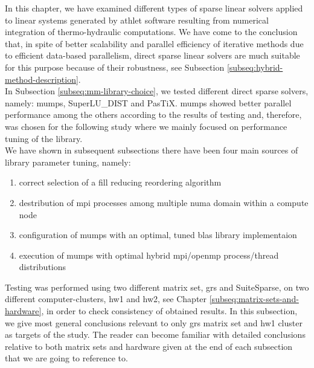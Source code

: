 \label{subseq:mm-conclusion}

In this chapter, we have examined different types of sparse linear solvers applied to linear systems generated by \acrshort{athlet} software resulting from numerical integration of thermo-hydraulic computations. We have come to the conclusion that, in spite of better scalability and parallel efficiency of iterative methods due to efficient data-based parallelism, direct sparse linear solvers are much suitable for this purpose because of their robustness, see Subsection \ref{subseq:hybrid-method-description}.\\


In Subsection \ref{subseq:mm-library-choice}, we tested different direct sparse solvers, namely: \acrshort{mumps},  SuperLU\_DIST and PasTiX. \acrshort{mumps} showed better parallel performance among the others according to  the results of testing and, therefore, was chosen for the following study where we mainly focused on performance tuning of the library.\\


We have shown in subsequent subsections there have been four main sources of library parameter tuning, namely:

\begin{enumerate}
	\item correct selection of a fill reducing reordering algorithm \label{conclusion:mm-1}
	\item destribution of \acrshort{mpi} processes among multiple \acrshort{numa} domain within a compute node \label{conclusion:mm-2}
	\item configuration of \acrshort{mumps} with an optimal, tuned \acrshort{blas} library implementaion \label{conclusion:mm-3}
	\item execution of \acrshort{mumps} with optimal hybrid \acrshort{mpi}/\acrshort{openmp} process/thread distributions \label{conclusion:mm-4}
\end{enumerate}


Testing was performed using two different matrix set, \acrshort{grs} and SuiteSparse, on two different computer-clusters, \gls{hw1} and \gls{hw2}, see Chapter \ref{subseq:matrix-sets-and-hardware}, in order to check consistency of obtained results. In this subsection, we  give most general conclusions relevant to only \acrshort{grs} matrix set and \gls{hw1} cluster as targets of the study. The reader can become familiar with detailed conclusions relative to both matrix sets and hardware given at the end of each subsection that we are going to reference to.\\



